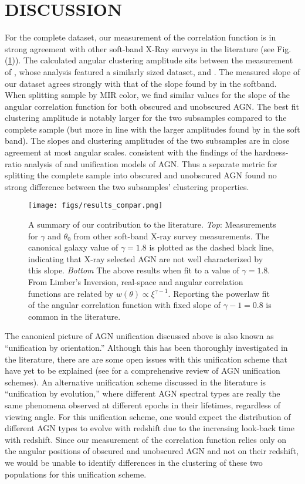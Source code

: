 \documentclass[preprint]{aastex63}
\begin{document}
\section{DISCUSSION}
For the complete dataset, our measurement of the correlation function is in strong agreement
with other soft-band X-Ray surveys in the literature (see Fig. (\ref{fig:comp})). The calculated angular clustering amplitude 
sits between the measurement of \cite{ebrero}, whose analysis featured a similarly sized dataset, and \cite{elyiv}. The 
measured slope of our dataset agrees strongly with that of the slope found by \cite{ebrero} in the softband. When splitting sample by MIR color, we find similar values for the slope 
of the angular correlation function for both obscured and unobscured AGN. The best fit clustering amplitude is notably larger for the two subsamples compared to the complete sample 
(but more in line with the larger amplitudes found by \citet{ebrero} in the soft band). The slopes and clustering amplitudes of the two subsamples are in close agreement at most angular scales.
consistent with the findings of the hardness-ratio analysis of  \cite{ebrero} and unification models of AGN.
Thus a separate metric for splitting the complete sample into obscured and unobscured AGN found no strong difference
between the two subsamples' clustering properties.

\begin{figure}[!ht]
    \centering
    \texttt{[image: figs/results\_compar.png]}
    \label{fig:comp}
    \caption{A summary of our contribution to the literature. \textit{Top}: Measurements for $\gamma$ and $\theta_0$
    from other soft-band X-ray survey measurements. The canonical galaxy value of  $\gamma = 1.8$ is plotted as the dashed black line,
    indicating that X-ray selected AGN are not well characterized by this slope. \textit{Bottom} The above results when fit to a value of 
    $\gamma = 1.8$. From Limber's Inversion, real-space and angular correlation functions are related by $w(\theta) \propto \xi^{\gamma - 1}$. 
    Reporting the powerlaw fit of the angular correlation function with fixed slope of $\gamma - 1 = 0.8$ is common 
    in the literature. 
    }
\end{figure}

The canonical picture of AGN unification discussed above is also known as ``unification by orientation.''  Although this has been thoroughly investigated
in the literature, there are are some open issues with this unification scheme that have yet to be explained (see \citet{netzer:2015} for a comprehensive review 
of AGN unification schemes). An alternative unification scheme discussed in the literature is ``unification by evolution,'' where different AGN 
spectral types are really the same phenomena observed at different epochs in their lifetimes, regardless of viewing angle. For this unification scheme, one would 
expect the distribution of different AGN types to evolve with redshift due to the increasing look-back time with redshift. 
Since our measurement of the correlation function relies only
on the angular positions of obscured and unobscured AGN and not on their redshift, we would be unable to identify differences 
in the clustering of these two populations for this unification scheme. 
\end{document}
